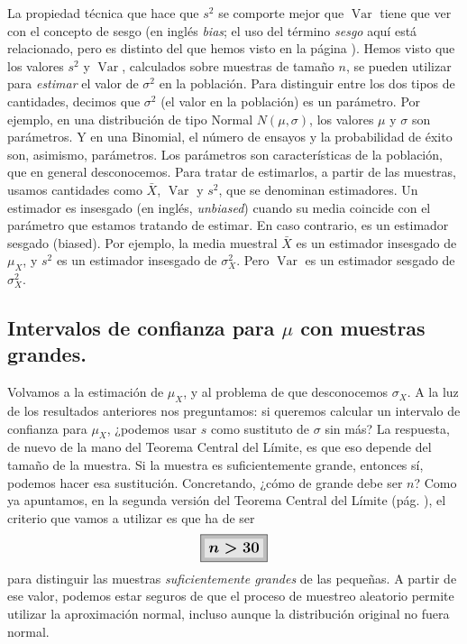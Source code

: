 La propiedad técnica que hace que $s^2$ se comporte mejor que
$\operatorname{Var}$ tiene que ver con el concepto de {\sf sesgo}
(en inglés {\em bias}; el uso del término {\em sesgo} aquí está relacionado, pero es distinto del que hemos visto en la página \pageref{cap05:subsec:ZooDistribucionesBinomiales}).
Hemos visto que los valores $s^2$ y
$\operatorname{Var}$, calculados sobre muestras de tamaño $n$, se pueden
utilizar para {\em estimar} el valor de $\sigma^2$ en la población. Para
distinguir entre los dos tipos de cantidades, decimos que $\sigma^2$ (el valor
en la población) es un {\sf parámetro}. Por ejemplo, en una
distribución de tipo Normal $N(\mu,\sigma)$, los valores $\mu$ y $\sigma$ son
parámetros. Y en una Binomial, el número de ensayos y la probabilidad de éxito
son, asimismo, parámetros. Los parámetros son características de la población,
que en general desconocemos. Para tratar de estimarlos, a partir de las
muestras, usamos cantidades como $\bar X$, $\operatorname{Var}$ y $s^2$, que se
denominan {\sf estimadores}. Un estimador es {\sf insesgado}
(en inglés, {\em unbiased}) cuando su media coincide con el parámetro que
estamos tratando de estimar. En caso contrario, es un estimador sesgado
(biased). Por ejemplo, la media muestral $\bar X$ es un estimador insesgado de
$\mu_X$, y $s^2$ es un estimador insesgado de $\sigma_X^2$. Pero
$\operatorname{Var}$ es un estimador sesgado de $\sigma_X^2$.

\subsection{Intervalos de confianza para $\mu$ con muestras grandes.}
\label{cap06:subsec:IntervaloConfianzaMediaMuestrasGrandes}

Volvamos a la estimación de $\mu_X$, y al problema de que desconocemos
$\sigma_X$. A la luz de los resultados anteriores nos preguntamos: si queremos
calcular un intervalo de confianza para $\mu_X$, ¿podemos usar $s$ como
sustituto de $\sigma$ sin más? La respuesta, de nuevo de la mano del Teorema
Central del Límite, es que eso depende del tamaño de la muestra. Si la muestra
es suficientemente grande, entonces sí, podemos hacer esa sustitución.
Concretando, ¿cómo de grande debe ser $n$? Como ya apuntamos, en la segunda
versión del Teorema Central del Límite (pág.
\pageref{cap06:teo:TCLsegundaVersion}), el criterio que vamos a utilizar es que
ha de ser
    \[\fcolorbox{black}{Gris025}{\colorbox{lightgrey}{\boldmath \large $n>30$}}\]
para distinguir las muestras {\em suficientemente grandes} de las pequeñas. A partir de ese valor, podemos estar
seguros de que el proceso de muestreo aleatorio permite utilizar la
aproximación normal, incluso aunque la distribución original no fuera normal.

